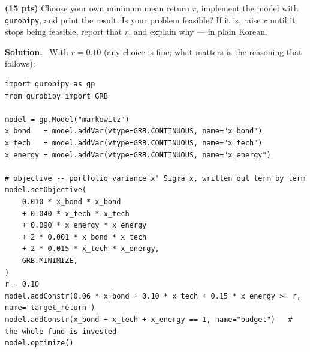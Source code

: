 \documentclass[10pt]{article}
\newenvironment{solution}
  {\par\smallskip\begingroup\color{solink}\textbf{Solution.}\ }
  {\endgroup\par}
\begin{document}
\begin{parts}
\item \textbf{(15 pts)} Choose your own minimum mean return $r$, implement the model with
  \texttt{gurobipy}, and print the result. Is your problem feasible? If it is, raise $r$
  until it stops being feasible, report that $r$, and explain why --- in plain Korean.

\begin{solution}
With $r = 0.10$ (any choice is fine; what matters is the reasoning that follows):
\begin{lstlisting}
import gurobipy as gp
from gurobipy import GRB

model = gp.Model("markowitz")
x_bond   = model.addVar(vtype=GRB.CONTINUOUS, name="x_bond")
x_tech   = model.addVar(vtype=GRB.CONTINUOUS, name="x_tech")
x_energy = model.addVar(vtype=GRB.CONTINUOUS, name="x_energy")

# objective -- portfolio variance x' Sigma x, written out term by term
model.setObjective(
    0.010 * x_bond * x_bond
    + 0.040 * x_tech * x_tech
    + 0.090 * x_energy * x_energy
    + 2 * 0.001 * x_bond * x_tech
    + 2 * 0.015 * x_tech * x_energy,
    GRB.MINIMIZE,
)
r = 0.10
model.addConstr(0.06 * x_bond + 0.10 * x_tech + 0.15 * x_energy >= r, name="target_return")
model.addConstr(x_bond + x_tech + x_energy == 1, name="budget")   # the whole fund is invested
model.optimize()


\end{lstlisting}
\end{solution}
\end{parts}
\end{document}
